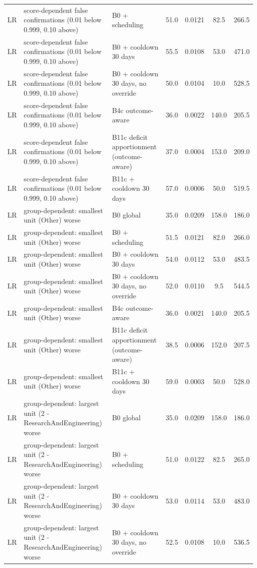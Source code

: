 \begin{longtable}{lp{5.2cm}p{4.4cm}cccc}
LR & score-dependent false confirmations (0.01 below 0.999, 0.10 above) & B0 + scheduling & 51.0 & 0.0121 & 82.5 & 266.5 \\
LR & score-dependent false confirmations (0.01 below 0.999, 0.10 above) & B0 + cooldown 30 days & 55.5 & 0.0108 & 53.0 & 471.0 \\
LR & score-dependent false confirmations (0.01 below 0.999, 0.10 above) & B0 + cooldown 30 days, no override & 50.0 & 0.0104 & 10.0 & 528.5 \\
LR & score-dependent false confirmations (0.01 below 0.999, 0.10 above) & B4c outcome-aware & 36.0 & 0.0022 & 140.0 & 205.5 \\
LR & score-dependent false confirmations (0.01 below 0.999, 0.10 above) & B11c deficit apportionment (outcome-aware) & 37.0 & 0.0004 & 153.0 & 209.0 \\
LR & score-dependent false confirmations (0.01 below 0.999, 0.10 above) & B11c + cooldown 30 days & 57.0 & 0.0006 & 50.0 & 519.5 \\
LR & group-dependent: smallest unit (Other) worse & B0 global & 35.0 & 0.0209 & 158.0 & 186.0 \\
LR & group-dependent: smallest unit (Other) worse & B0 + scheduling & 51.5 & 0.0121 & 82.0 & 266.0 \\
LR & group-dependent: smallest unit (Other) worse & B0 + cooldown 30 days & 54.0 & 0.0112 & 53.0 & 483.5 \\
LR & group-dependent: smallest unit (Other) worse & B0 + cooldown 30 days, no override & 52.0 & 0.0110 & 9.5 & 544.5 \\
LR & group-dependent: smallest unit (Other) worse & B4c outcome-aware & 36.0 & 0.0021 & 140.0 & 205.5 \\
LR & group-dependent: smallest unit (Other) worse & B11c deficit apportionment (outcome-aware) & 38.5 & 0.0006 & 152.0 & 207.5 \\
LR & group-dependent: smallest unit (Other) worse & B11c + cooldown 30 days & 59.0 & 0.0003 & 50.0 & 528.0 \\
LR & group-dependent: largest unit (2 - ResearchAndEngineering) worse & B0 global & 35.0 & 0.0209 & 158.0 & 186.0 \\
LR & group-dependent: largest unit (2 - ResearchAndEngineering) worse & B0 + scheduling & 51.0 & 0.0122 & 82.5 & 265.0 \\
LR & group-dependent: largest unit (2 - ResearchAndEngineering) worse & B0 + cooldown 30 days & 53.0 & 0.0114 & 53.0 & 483.0 \\
LR & group-dependent: largest unit (2 - ResearchAndEngineering) worse & B0 + cooldown 30 days, no override & 52.5 & 0.0108 & 10.0 & 536.5 \\

\end{longtable}
